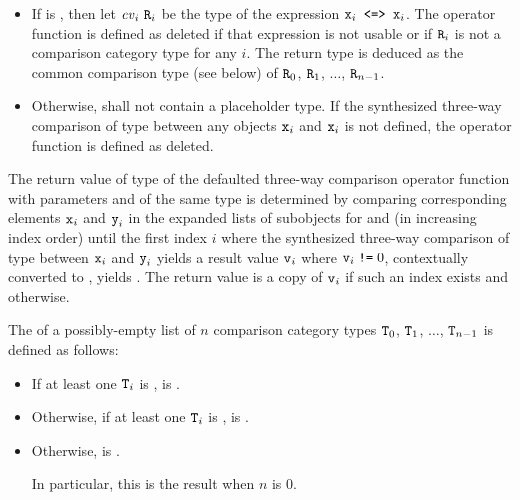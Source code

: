 \begin{itemize}
\item
If  is , then
let $\cv{}_i~\tcode{R}_i$ be
the type of the expression $\tcode{x}_i\tcode{ <=> }\tcode{x}_i$.
The operator function is defined as deleted
if that expression is not usable or
if $\texttt{\protect R}_i$ is not
a comparison category type for any $i$.
The return type is deduced as
the common comparison type (see below) of
$\texttt{\protect R}_0$, $\texttt{\protect R}_1$, $\dotsc$, $\texttt{\protect R}_{n-1}$.
\item
Otherwise,  shall not contain a placeholder type.
If the synthesized three-way comparison of type 
between any objects $\texttt{\protect x}_i$ and $\texttt{\protect x}_i$
is not defined,
the operator function is defined as deleted.
\end{itemize}

\pnum
The return value of type 
of the defaulted three-way comparison operator function
with parameters  and  of the same type
is determined by comparing corresponding elements
$\texttt{\protect x}_i$ and $\texttt{\protect y}_i$
in the expanded lists of subobjects for  and 
(in increasing index order)
until the first index $i$ where
the synthesized three-way comparison of type 
between $\texttt{\protect x}_i$ and $\texttt{\protect y}_i$
yields a result value $\texttt{\protect v}_i$ where $\texttt{\protect v}_i \mathrel{\texttt{\protect!=}} 0$,
contextually converted to , yields .
The return value is a copy of $\texttt{\protect v}_i$
if such an index exists and
 otherwise.

\pnum
The  
of a possibly-empty list of $n$ comparison category types
$\texttt{\protect T}_0$, $\texttt{\protect T}_1$, $\dotsc$, $\texttt{\protect T}_{n-1}$
is defined as follows:

\begin{itemize}
\item
If at least one $\texttt{\protect T}_i$ is ,
 is .

\item
Otherwise, if at least one $\texttt{\protect T}_i$ is ,
 is .

\item
Otherwise,  is .
\begin{note}
In particular, this is the result when $n$ is 0.
\end{note}
\end{itemize}

